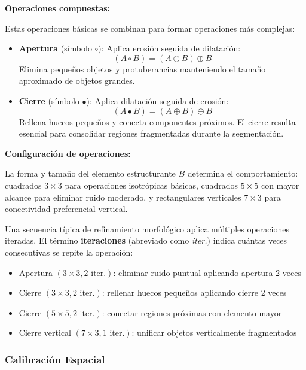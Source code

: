 \textbf{Operaciones compuestas:}

Estas operaciones básicas se combinan para formar operaciones más complejas:

\begin{itemize}
\item \textbf{Apertura} (símbolo $\circ$): Aplica erosión seguida de dilatación:
\begin{equation}
(A \circ B) = (A \ominus B) \oplus B
\end{equation}
Elimina pequeños objetos y protuberancias manteniendo el tamaño aproximado de objetos grandes.

\item \textbf{Cierre} (símbolo $\bullet$): Aplica dilatación seguida de erosión:
\begin{equation}
(A \bullet B) = (A \oplus B) \ominus B
\end{equation}
Rellena huecos pequeños y conecta componentes próximos. El cierre resulta esencial para consolidar regiones fragmentadas durante la segmentación.
\end{itemize}

\textbf{Configuración de operaciones:}

La forma y tamaño del elemento estructurante $B$ determina el comportamiento: cuadrados $3 \times 3$ para operaciones isotrópicas básicas, cuadrados $5 \times 5$ con mayor alcance para eliminar ruido moderado, y rectangulares verticales $7 \times 3$ para conectividad preferencial vertical.

Una secuencia típica de refinamiento morfológico aplica múltiples operaciones iteradas. El término \textbf{iteraciones} (abreviado como \textit{iter.}) indica cuántas veces consecutivas se repite la operación:
\begin{itemize}
\item Apertura $(3 \times 3, 2 \text{ iter.})$: eliminar ruido puntual aplicando apertura 2 veces
\item Cierre $(3 \times 3, 2 \text{ iter.})$: rellenar huecos pequeños aplicando cierre 2 veces
\item Cierre $(5 \times 5, 2 \text{ iter.})$: conectar regiones próximas con elemento mayor
\item Cierre vertical $(7 \times 3, 1 \text{ iter.})$: unificar objetos verticalmente fragmentados
\end{itemize}

\subsubsection{Calibración Espacial}

